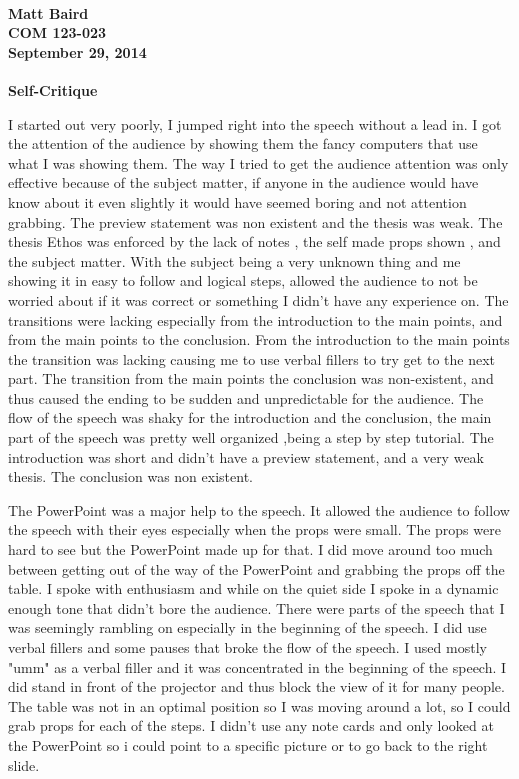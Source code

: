 \documentclass[12pt,letterpaper]{article}
\author{Matthew Baird}
\begin{document}
\paragraph{Matt Baird \\ COM 123-023 \\ September 29, 2014 }
\begin{center}
\textbf{Self-Critique}
\end{center}
\par{ I started out very poorly, I jumped right into the speech without a lead in. I got the attention of the audience by showing them the fancy computers that use what I was showing them. The way I tried to get the audience attention was only effective because of the  subject matter, if anyone in the audience would have know about it even slightly it would have seemed boring and not attention grabbing. The preview statement was non existent and the thesis was weak. The thesis Ethos was enforced by the lack of notes , the self made props shown , and the subject matter. With the subject being a very unknown thing and me showing it in easy to follow and logical steps, allowed the audience to not be worried about if it was correct or something I didn't have any experience on. The transitions were lacking especially from the introduction to the main points, and from the main points to the conclusion. From the introduction to the main points the transition was lacking causing me to use verbal fillers to try get to the next part. The transition from the main points the  conclusion was non-existent, and thus caused the ending to be sudden and unpredictable for the audience. The flow of the speech was shaky for the introduction and the conclusion, the main part of the speech was pretty well organized ,being a step by step tutorial. The introduction was short and didn't have a preview statement, and a very weak thesis. The conclusion was non existent.  }

\par{ The PowerPoint was a major help to the speech. It allowed the audience to follow the speech with their eyes especially when the props were small. The props were hard to see but the PowerPoint made up for that. I did move around too much between getting out of the way of the PowerPoint and grabbing the props off the table.  I spoke with enthusiasm and while on the quiet side I spoke in a dynamic enough tone that didn't bore the audience. There were parts of the speech that I was seemingly rambling on especially in the beginning of the speech.  I did use verbal fillers and some pauses that broke the flow of the speech. I used mostly  "umm" as a verbal filler and it was concentrated in the beginning  of the speech. I did stand in front of the projector and thus block the view of it for many people. The table was not in an optimal position so I was moving around a lot, so I could grab props for each of the steps. I didn't use any note cards and only looked at the PowerPoint so i could point to a specific picture or to go back to the right slide. }
\end{document}
